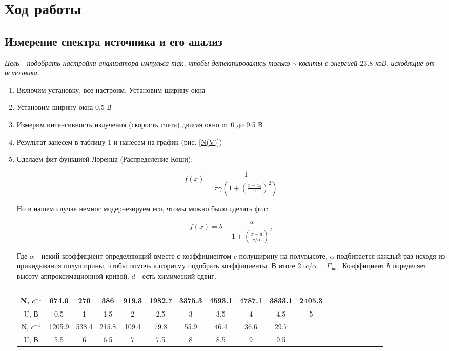 \documentclass[a4paper]{article}
\begin{document}
\section{Ход работы}

\subsection{Измерение спектра источника и его анализ}

\textit{Цель - подобрать настройки анализатора импульса так, чтобы детектировались только $\gamma$-кванты с энергией $23.8$ кэВ, исходящие от источника}

\begin{enumerate}
    \item Включим установку, все настроим. Установим ширину окна
    \item Установим ширину окна 0.5 В
    \item Измерим интенсивность излучения (скорость счета) двигая окно от 0 до 9.5 В
    \item Результат занесем в таблицу 1 и нанесем на график (рис. \ref{N(V)})
    \item Сделаем фит функцией Лоренца (Распределение Коши):
    
    \begin{equation}
        f(x) = \frac{1}{\pi \gamma \left( 1 + \left(\frac{x - x_0}{\gamma} \right)^2 \right)}
    \end{equation}

    Но в нашем случае немног модернезируем его, чтомы можно было сделать фит:

    \begin{equation}
        f(x) = b  - \frac{a}{1 + \left( \frac{x-d}{c/ \alpha} \right)^2}
    \end{equation}

    Где $\alpha$ - некий коэффициент определяющий вместе с коэффициентом $c$ полуширину на полувысоте, $\alpha$ подбирается каждый раз исходя из прикидывания полуширины, чтобы помочь алгоритму подобрать коэффициенты.
    В итоге $2 \cdot c/\alpha = \Gamma_{экс}$.
    Коэффициент $b$ определяет высоту аппроксимационной кривой. $d$ - есть химический сдвиг. 

\begin{table}[H]
    \centering
    \caption{}
    \label{t1}
    \vspace{0.1cm}
    \begin{tabular}{|c||c|c|c|c|c|c|c|c|c|c|c|c|c|c|c|c|c|c|}
 \hline
N, $c^{-1}$ & 674.6&270&386&919.3&1982.7&3375.3&4593.1&4787.1&3833.1&2405.3\\
\hline
U, В & 0.5 & 1 & 1.5 & 2 & 2.5  & 3 & 3.5 & 4&4.5&5   \\
\hline
\hline
N, $c^{-1}$ & 1205.9&538.4&215.8&109.4&79.8&55.9&46.4&36.6&29.7& \\ 
\hline
U, В & 5.5&6&6.5&7&7.5&8&8.5&9&9.5& \\
\hline
\end{tabular}
\end{table}


\end{enumerate}
\end{document}
